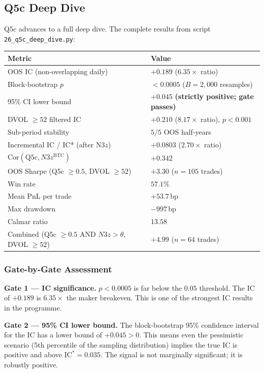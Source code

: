 \documentclass[12pt, a4paper]{article}
\theoremstyle{plain}
\theoremstyle{definition}
\newcommand{\IC}{\mathrm{IC}}
\newcommand{\Cor}{\mathrm{Cor}}
\newcommand{\bp}{\,\mathrm{bp}}
\begin{document}
\subsection{Q5c Deep Dive}
\label{sec:q5c_deep}

Q5c advances to a full deep dive.  The complete results from script
\texttt{26\_q5c\_deep\_dive.py}:

\begin{center}
\begin{tabular}{ll}
\toprule
Metric & Value \\
\midrule
OOS IC (non-overlapping daily) & $+0.189$ ($6.35\times$ ratio) \\
Block-bootstrap $p$ & $< 0.0005$ ($B = 2{,}000$ resamples) \\
95\% CI lower bound & $+0.045$ \textbf{(strictly positive; gate passes)} \\
DVOL $\geq 52$ filtered IC & $+0.210$ ($8.17\times$ ratio), $p < 0.001$ \\
Sub-period stability & $5/5$ OOS half-years \\
Incremental IC / IC* (after N3$z$) & $+0.0803$ ($2.70\times$ ratio) \\
$\Cor(\text{Q5c}, N3z^{\mathrm{BTC}})$ & $+0.342$ \\
\midrule
OOS Sharpe (Q5c $\geq 0.5$, DVOL $\geq 52$) & $+3.30$ ($n = 105$ trades) \\
Win rate & $57.1\%$ \\
Mean PnL per trade & $+53.7\bp$ \\
Max drawdown & $-997\bp$ \\
Calmar ratio & $13.58$ \\
\midrule
Combined (Q5c $\geq 0.5$ AND $N3z > \theta$, DVOL $\geq 52$) & $+4.99$ ($n = 64$ trades) \\
\bottomrule
\end{tabular}
\end{center}

\subsubsection{Gate-by-Gate Assessment}

\textbf{Gate 1 --- IC significance.}  $p < 0.0005$ is far below the $0.05$
threshold.  The IC of $+0.189$ is $6.35\times$ the maker breakeven.  This
is one of the strongest IC results in the programme.

\textbf{Gate 2 --- 95\% CI lower bound.}  The block-bootstrap 95\%
confidence interval for the IC has a lower bound of $+0.045 > 0$.  This
means even the pessimistic scenario (5th percentile of the sampling
distribution) implies the true IC is positive and above $\IC^* = 0.035$.
The signal is not marginally significant; it is robustly positive.
\end{document}

